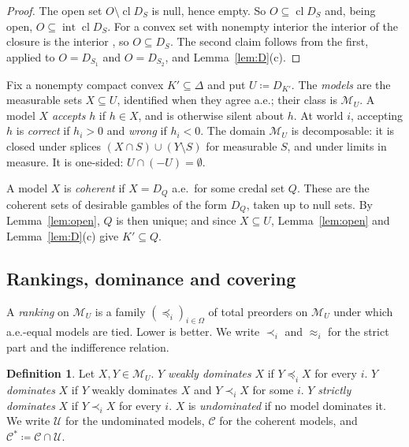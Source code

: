 \documentclass[11pt]{article}
\newcommand{\M}{\mathcal{M}}
\DeclareMathOperator{\cl}{cl}
\DeclareMathOperator{\inter}{int}
\theoremstyle{plain}
\theoremstyle{definition}
\newtheorem{definition}[theorem]{Definition}
\theoremstyle{remark}
\begin{document}
\begin{proof}
The open set $O\setminus\cl D_S$ is null, hence empty. So $O\subseteq\cl D_S$ and, being
open, $O\subseteq\inter\cl D_S$. For a convex set with nonempty interior the interior of
the closure is the interior \cite[Thm.~6.3]{Rockafellar}, so $O\subseteq D_S$. The second
claim follows from the first, applied to $O=D_{S_1}$ and $O=D_{S_2}$, and
Lemma~\ref{lem:D}(c).
\end{proof}

Fix a nonempty compact convex $K'\subseteq\Delta$ and put $U\coloneqq D_{K'}$. The
\emph{models} are the measurable sets $X\subseteq U$, identified when they agree a.e.;
their class is $\M_U$. A model $X$ \emph{accepts} $h$ if $h\in X$, and is otherwise
silent about $h$. At world $i$, accepting $h$ is \emph{correct} if $h_i>0$ and
\emph{wrong} if $h_i<0$. The domain $\M_U$ is decomposable: it is closed under splices
$(X\cap S)\cup(Y\setminus S)$ for measurable $S$, and under limits in measure. It is
one-sided: $U\cap(-U)=\emptyset$.

A model $X$ is \emph{coherent} if $X=D_Q$ a.e.\ for some credal set $Q$. These are the
coherent sets of desirable gambles of the form $D_Q$, taken up to null sets. By
Lemma~\ref{lem:open}, $Q$ is then unique; and since $X\subseteq U$, Lemma~\ref{lem:open}
and Lemma~\ref{lem:D}(c) give $K'\subseteq Q$.

\subsection{Rankings, dominance and covering}

A \emph{ranking} on $\M_U$ is a family $(\preceq_i)_{i\in\Omega}$ of total preorders on
$\M_U$ under which a.e.-equal models are tied. Lower is better. We write $\prec_i$ and
$\approx_i$ for the strict part and the indifference relation.

\begin{definition}\label{def:dom}
Let $X,Y\in\M_U$. $Y$ \emph{weakly dominates} $X$ if $Y\preceq_iX$ for every $i$. $Y$
\emph{dominates} $X$ if $Y$ weakly dominates $X$ and $Y\prec_iX$ for some $i$. $Y$
\emph{strictly dominates} $X$ if $Y\prec_iX$ for every $i$. $X$ is \emph{undominated} if
no model dominates it. We write $\mathcal U$ for the undominated models, $\mathcal C$
for the coherent models, and $\mathcal C^\ast\coloneqq\mathcal C\cap\mathcal U$.
\end{definition}
\end{document}
